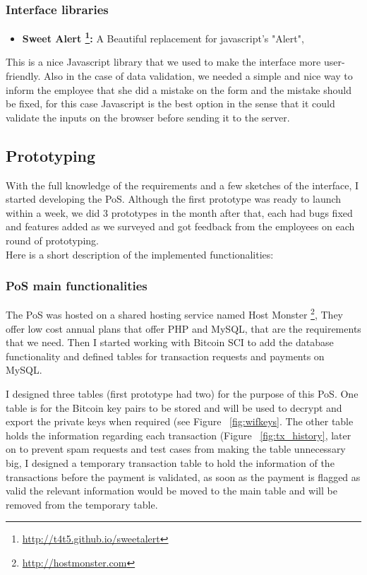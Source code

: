\subsubsection{Interface libraries}
\begin{itemize}
\item \textbf{Sweet Alert \footnote{\url{http://t4t5.github.io/sweetalert}}: }  A Beautiful replacement for javascript's "Alert", 
\end{itemize}

This is a nice Javascript library that we used to make the interface more user-friendly. Also in the case of data validation, we needed a simple and nice way to inform the employee that she did a mistake on the form and the mistake should be fixed, for this case Javascript is the best option in the sense that it could validate the inputs on the browser before sending it to the server.


\subsection{Prototyping}
With the full knowledge of the requirements and a few sketches of the interface, I started developing the PoS. Although the first prototype was ready to launch within a week, we did 3 prototypes in the month after that, each had bugs fixed and features added as we surveyed and got feedback from the employees on each round of prototyping.
\\
Here is a short description of the implemented functionalities:

\subsubsection{PoS main functionalities}
The PoS was hosted on a shared hosting service named Host Monster \footnote{\url{http://hostmonster.com}}, They offer low cost annual plans that offer PHP and MySQL, that are the requirements that we need.
Then I started working with Bitcoin SCI to add the database functionality and defined tables for transaction requests and payments on MySQL.

I designed three tables (first prototype had two) for the purpose of this PoS. One table is for the Bitcoin key pairs to be stored and will be used to decrypt and export the private keys when required (see Figure ~\ref{fig:wifkeys}. The other table holds the information regarding each transaction (Figure ~\ref{fig:tx_history}, later on to prevent spam requests and test cases from making the table unnecessary big, I designed a temporary transaction table to hold the information of the transactions before the payment is validated, as soon as the payment is flagged as valid the relevant information would be moved to the main table and will be removed from the temporary table.

